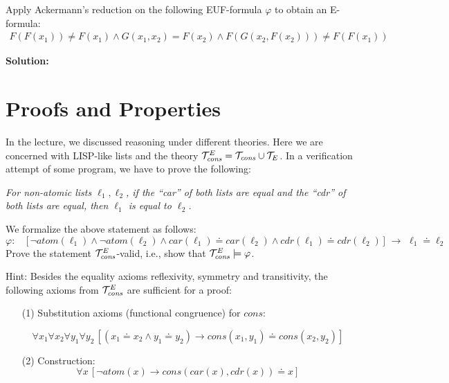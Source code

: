 \documentclass[11pt,a4paper]{uebung}
\newcommand{\solution}[1]{\par {\bf Solution:}\\#1}
\def\impl{\rightarrow}
\begin{document}
Apply Ackermann's reduction on the following EUF-formula $\varphi$ to obtain
an E-formula:
\begin{gather*}
  F(F(x_1)) \neq F(x_1) \land G(x_1,x_2) = F(x_2) \land F(G(x_2,F(x_2))) \neq F(F(x_1))
\end{gather*}

\solution{

}



\newpage
\section{Proofs and Properties}

\newcommand{\semder}{\models}
In the lecture, we discussed reasoning under different theories. Here we are
concerned with LISP-like lists and the theory ${\cal T}_{\mathit{cons}}^E =
{\cal T}_{\mathit{cons}}\cup {\cal T}_E$.  In a verification attempt of some program,
we have to prove the following:
\begin{center}
\begin{minipage}{0.8\textwidth}
{\em For non-atomic lists $\ell_1, \ell_2$, if the ``car'' of both lists are
  equal and the ``cdr'' of both lists are equal, then $\ell_1$ is equal to
  $\ell_2$.  }
\end{minipage}
\end{center}
We formalize the above statement as follows:
$$ \varphi \colon \quad
\big[\, \neg \textit{atom}(\ell_1) \land \neg \textit{atom}(\ell_2) \land 
\textit{car}(\ell_1)  \doteq \textit{car}(\ell_2) \land  
\textit{cdr}(\ell_1) \doteq \textit{cdr}(\ell_2) \, \big] \,\, 
\impl \,\,  \ell_1 \doteq \ell_2  
$$
Prove the statement ${\cal T}_{\mathit{cons}}^E$-valid, i.e., show that
$\caT_{\mathit{cons}}^E \semder \varphi$.

\medskip

Hint: Besides the equality axioms reflexivity, symmetry and transitivity, the
following axioms from ${\cal T}_{\mathit{cons}}^E$ are sufficient for a proof:
\begin{itemize}

\item[(1)] Substitution axioms (functional congruence) for
  $\textit{cons}$: 

  $$\forall x_1\forall x_2 \forall y_1 \forall y_2 \, [
(x_1 \doteq x_2 \land y_1 \doteq y_2) \impl   
\textit{cons}(x_1,y_1) \doteq \textit{cons}(x_2,y_2)]$$
\item[(2)] Construction:
$$\forall x\, [\neg \textit{atom}(x) \impl 
\textit{cons}(\textit{car}(x), \textit{cdr}(x)) \doteq x] $$ 

\end{itemize}
\end{document}
